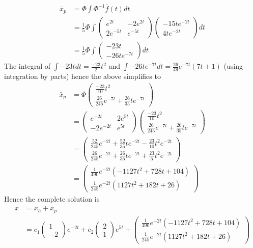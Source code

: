 \documentclass[11pt]{book}
\begin{document}
\begin{align*}
\bar{x}_{p}  & =\Phi\int\Phi^{-1}\bar{f}\left(  t\right)  dt\\
& =\frac{1}{5}\Phi\int%
\begin{pmatrix}
e^{2t} & -2e^{2t}\\
2e^{-5t} & e^{-5t}%
\end{pmatrix}%
\begin{pmatrix}
-15te^{-2t}\\
4te^{-2t}%
\end{pmatrix}
dt\\
& =\frac{1}{5}\Phi\int%
\begin{pmatrix}
-23t\\
-26te^{-7t}%
\end{pmatrix}
dt
\end{align*}
The integral of  $\allowbreak\int-23tdt=\frac{-23}{2}t^{2}$ and $\int%
-26te^{-7t}dt=\allowbreak\frac{26}{49}e^{-7t}\left(  7t+1\right)  $ (using
integration by parts) hence the above simplifies to%
\begin{align*}
\bar{x}_{p}  & =\Phi%
\begin{pmatrix}
\frac{-23}{10}t^{2}\\
\frac{26}{245}e^{-7t}+\frac{26}{35}te^{-7t}%
\end{pmatrix}
\\
& =%
\begin{pmatrix}
e^{-2t} & 2e^{5t}\\
-2e^{-2t} & e^{5t}%
\end{pmatrix}%
\begin{pmatrix}
\frac{-23}{10}t^{2}\\
\frac{26}{245}e^{-7t}+\frac{26}{35}te^{-7t}%
\end{pmatrix}
\\
& =%
\begin{pmatrix}
\frac{52}{245}e^{-2t}+\frac{52}{35}te^{-2t}-\frac{23}{10}t^{2}e^{-2t}\\
\frac{26}{245}e^{-2t}+\frac{26}{35}te^{-2t}+\frac{23}{5}t^{2}e^{-2t}%
\end{pmatrix}
\\
& =%
\begin{pmatrix}
\frac{1}{490}e^{-2t}\left(  -1127t^{2}+728t+104\right)  \\
\frac{1}{245}e^{-2t}\left(  1127t^{2}+182t+26\right)
\end{pmatrix}
\end{align*}
Hence the complete solution is%
\begin{align*}
\bar{x}  & =\bar{x}_{h}+\bar{x}_{p}\\
& =c_{1}%
\begin{pmatrix}
1\\
-2
\end{pmatrix}
e^{-2t}+c_{2}%
\begin{pmatrix}
2\\
1
\end{pmatrix}
e^{5t}+%
\begin{pmatrix}
\frac{1}{490}e^{-2t}\left(  -1127t^{2}+728t+104\right)  \\
\frac{1}{245}e^{-2t}\left(  1127t^{2}+182t+26\right)
\end{pmatrix}
\end{align*}
\end{document}
